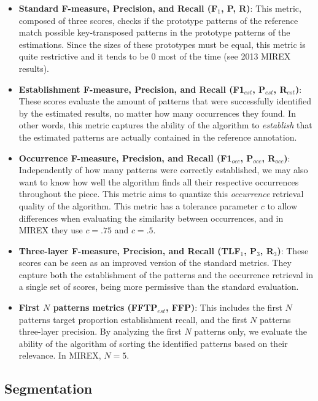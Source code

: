\documentclass{article}
\begin{document}
\begin{itemize}
    \item
      \textbf{Standard F-measure, Precision, and Recall (F$_1$, P, R)}: This metric, composed of three scores, checks if the prototype patterns of the reference match possible key-transposed patterns in the prototype patterns of the estimations.
      Since the sizes of these prototypes must be equal, this metric is quite restrictive and it tends to be 0 most of the time (see 2013 MIREX results).
    \item
      \textbf{Establishment F-measure, Precision, and Recall (F1$_{est}$, P$_{est}$, R$_{est}$)}: These scores evaluate the amount of patterns that were successfully identified by the estimated results, no matter how many occurrences they found.
      In other words, this metric captures the ability of the algorithm to \textit{establish} that the estimated patterns are actually contained in the reference annotation.
    \item 
      \textbf{Occurrence F-measure, Precision, and Recall (F1$_{occ}$, P$_{occ}$, R$_{occ}$)}: Independently of how many patterns were correctly established, we may also want to know how well the algorithm finds all their respective occurrences throughout the piece.
      This metric aims to quantize this \textit{occurrence} retrieval quality of the algorithm.
      This metric has a tolerance parameter $c$ to allow differences when evaluating the similarity between occurrences, and in MIREX they use $c=.75$ and $c=.5$.
    \item
      \textbf{Three-layer F-measure, Precision, and Recall (TLF$_1$, P$_3$, R$_3$)}: These scores can be seen as an improved version of the standard metrics.
      They capture both the establishment of the patterns and the occurrence retrieval in a single set of scores, being more permissive than the standard evaluation.
    \item
      \textbf{First $N$ patterns metrics (FFTP$_{est}$, FFP)}: This includes the first $N$ patterns target proportion establishment recall, and the first $N$ patterns three-layer precision. 
      By analyzing the first $N$ patterns only, we evaluate the ability of the algorithm of sorting the identified patterns based on their relevance. 
      In MIREX, $N=5$.

\end{itemize}

\subsection{Segmentation}
\end{document}
